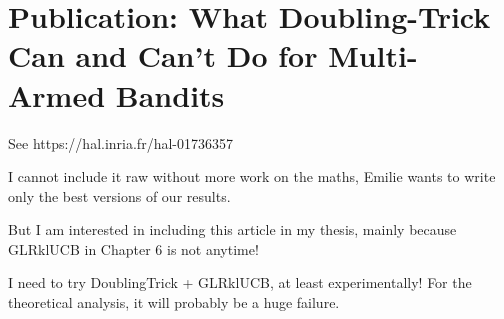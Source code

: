 \chapter{Publication: What Doubling-Trick Can and Can't Do for Multi-Armed Bandits}
\label{app:2:DoublingTricks}

See https://hal.inria.fr/hal-01736357

I cannot include it raw without more work on the maths, Emilie wants to write only the best versions of our results.

But I am interested in including this article in my thesis, mainly because GLRklUCB in Chapter 6 is not anytime!

I need to try DoublingTrick + GLRklUCB, at least experimentally!
For the theoretical analysis, it will probably be a huge failure.
